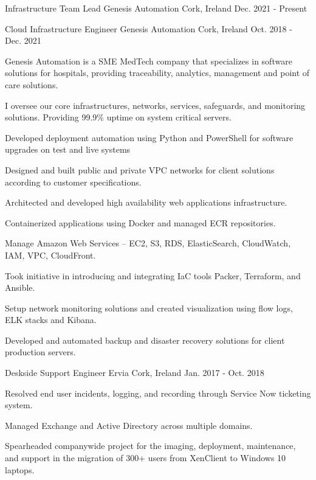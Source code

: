 


\begin{cventries}

\cventry
{Infrastructure Team Lead}
{Genesis Automation}
{Cork, Ireland}
{Dec. 2021 - Present}

\cventry
{Cloud Infrastructure Engineer}
{Genesis Automation}
{Cork, Ireland}
{Oct. 2018 - Dec. 2021}
{
\begin{cvitems}
\item {Genesis Automation is a SME MedTech company that specializes in software solutions for hospitals, providing traceability, analytics, management and point of care solutions.}
\item {I oversee our core infrastructures, networks, services, safeguards, and monitoring solutions. Providing 99.9\% uptime on system critical servers.}
\item {Developed deployment automation using Python and PowerShell for software upgrades on test and live systems}
\item {Designed and built public and private VPC networks for client solutions according to customer specifications.}
\item {Architected and developed high availability web applications infrastructure.}
\item {Containerized applications using Docker and managed ECR repositories.}
\item {Manage Amazon Web Services – EC2, S3, RDS, ElasticSearch, CloudWatch, IAM, VPC, CloudFront.}
\item {Took initiative in introducing and integrating IaC tools Packer, Terraform, and Ansible.}
\item {Setup network monitoring solutions and created visualization using flow logs, ELK stacks and Kibana.}
\item {Developed and automated backup and disaster recovery solutions for client production servers.}
\end{cvitems}
}


\cventry
{Deskside Support Engineer} %
{Ervia} %
{Cork, Ireland} %
{Jan. 2017 - Oct. 2018} %
{ %
\begin{cvitems}
\item {Resolved end user incidents, logging, and recording through Service Now ticketing system.}
\item {Managed Exchange and Active Directory across multiple domains.}
\item {Spearheaded companywide project for the imaging, deployment, maintenance, and support in the migration of 300+ users from XenClient to Windows 10 laptops.}
\end{cvitems}
}


\end{cventries}
